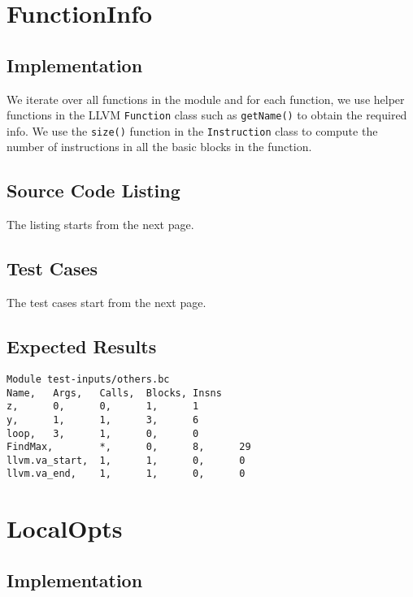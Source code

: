 \section{FunctionInfo}

\subsection{Implementation}

We iterate over all functions in the module and for each function, we use helper functions in the
LLVM \texttt{Function} class such as \texttt{getName()} to obtain the required info.
We use the \texttt{size()} function in the \texttt{Instruction} class to compute the number of
instructions in all the basic blocks in the function.

\subsection{Source Code Listing}

The listing starts from the next page.



\subsection{Test Cases}

The test cases start from the next page.



\subsection{Expected Results}

\begin{verbatim}
Module test-inputs/others.bc
Name,   Args,   Calls,  Blocks, Insns
z,      0,      0,      1,      1
y,      1,      1,      3,      6
loop,   3,      1,      0,      0
FindMax,        *,      0,      8,      29
llvm.va_start,  1,      1,      0,      0
llvm.va_end,    1,      1,      0,      0
\end{verbatim}

\section{LocalOpts}

\subsection{Implementation}

